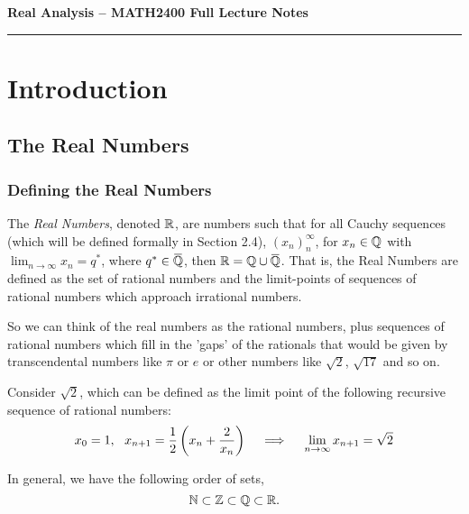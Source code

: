 \documentclass[12pt]{article}
\theoremstyle{definition}
\newcommand{\Overbar}[1]{\mkern 1.5mu\overline{\mkern-1.5mu#1\mkern-1.5mu}\mkern 1.5mu}
\begin{document}
\thispagestyle{contents}
\begin{center}
    \centerline{\large{\textbf{Real Analysis -- MATH2400 Full Lecture Notes}}}
\end{center}

\hrule

\tableofcontents

\newpage

\section{Introduction}
   \subsection{The Real Numbers}
   \subsubsection{Defining the Real Numbers}
    The \textit{Real Numbers}, denoted $\R$, are numbers such that for all Cauchy sequences (which will be defined formally in Section 2.4), $(x_{n})_{n}^{\infty}$, for $x_{n} \in \mathbb{Q}$ with $\lim_{n \rightarrow \infty}x_{n} = q^{\ast}$, where $q^{\ast} \in \Overbar{\Q}$, then $\R = \Q \cup \Overbar{\Q}$. 
    That is, the Real Numbers are defined as the set of rational numbers and the limit-points of sequences of rational numbers which approach irrational numbers. 

    \begin{remark}
        So we can think of the real numbers as the rational numbers, plus sequences of rational numbers which fill in the 'gaps' of the rationals that would be given by transcendental numbers like $\pi$ or $e$ or other numbers like $\sqrt{2}$, $\sqrt{17}$ and so on.
    \end{remark}
    \begin{eg}
        Consider $\sqrt{2}$, which can be defined as the limit point of the following recursive sequence of rational numbers: 
        \begin{equation*}
            x_{0} = 1, ~~ x_{n + 1} = \frac{1}{2}\left(x_{n} + \frac{2}{x_{n}}\right) \quad \implies \quad \lim_{n \rightarrow \infty}x_{n + 1} = \sqrt{2}
        \end{equation*}
    \end{eg}

    In general, we have the following order of sets,
    \begin{equation*}
            \N \subset \Z \subset \Q \subset \R.
    \end{equation*} 
    \begin{figure}[H]
        \centering
    \end{figure}
\end{document}

